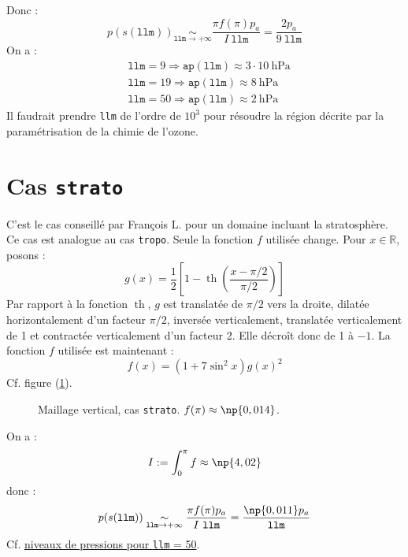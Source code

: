 \documentclass[a4paper,french]{article}
\DeclareMathOperator{\tgh}{th}
\begin{document}
Donc :
\begin{displaymath}
  p(s(\mathtt{llm}))
  \underset{\mathtt{llm} \to +\infty}{\sim}
  \frac{\pi f(\pi) p_a}{I\ \mathtt{llm}}
  = \frac{2 p_a}{9\ \mathtt{llm}}
\end{displaymath}
On a :
\begin{align*}
  & \mathtt{llm} = 9 \Rightarrow \mathtt{ap(llm)}
  \approx 3 \cdot 10\ \mathrm{hPa} \\
  & \mathtt{llm} = 19 \Rightarrow \mathtt{ap(llm)} \approx 8\ \mathrm{hPa} \\
  & \mathtt{llm} = 50 \Rightarrow \mathtt{ap(llm)} \approx 2\ \mathrm{hPa}
\end{align*}
Il faudrait prendre \verb+llm+ de l'ordre de $10^3$ pour résoudre la
région décrite par la paramétrisation de la chimie de l'ozone.

\section{Cas \texttt{strato}}

C'est le cas conseillé par François L. pour un domaine incluant la
stratosphère. Ce cas est analogue au cas \verb+tropo+. Seule la
fonction $f$ utilisée change. Pour $x \in \mathbb{R}$, posons :
\begin{displaymath}
  g(x)
  = \frac{1}{2} \left[1 - \tgh\left(\frac{x - \pi / 2}{\pi / 2}\right)\right]
\end{displaymath}
Par rapport à la fonction $\tgh$, $g$ est translatée de $\pi / 2$ vers
la droite, dilatée horizontalement d'un facteur $\pi / 2$, inversée
verticalement, translatée verticalement de 1 et contractée
verticalement d'un facteur 2. Elle décroît donc de 1 à $-1$. La
fonction $f$ utilisée est maintenant :
\begin{displaymath}
  f(x) = (1 + 7 \sin^2 x) g(x)^2
\end{displaymath}
Cf. figure (\ref{fig:strato}).
\begin{figure}[htbp]
  \centering
  
  \caption[Maillage vertical, cas \texttt{strato}]{Maillage vertical,
    cas \texttt{strato}. $f(\pi) \approx \np{0,014}$.}
  \label{fig:strato}
\end{figure}
On a :
\begin{displaymath}
  I := \int_0 ^\pi f \approx \np{4,02}
\end{displaymath}
donc :
\begin{displaymath}
  p(s(\mathtt{llm}))
  \underset{\mathtt{llm} \to +\infty}{\sim}
  \frac{\pi f(\pi) p_a}{I\ \mathtt{llm}}
  = \frac{\np{0,011} p_a}{\mathtt{llm}}
\end{displaymath}
Cf. \href{file:///user/guez/Documents/Around_LMDZ/strato_50.odg}{niveaux
  de pressions pour \texttt{llm} = 50}.
\end{document}
